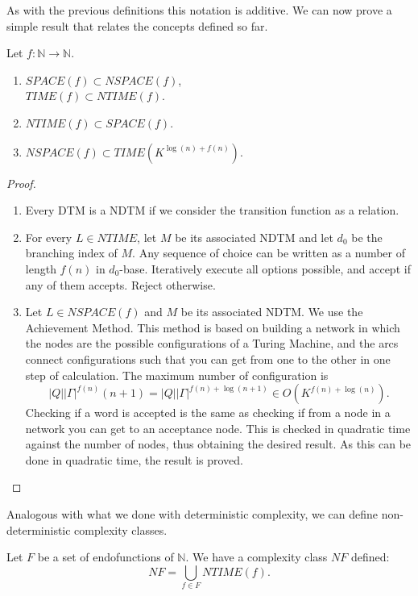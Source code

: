 As with the previous definitions this notation is additive. We can now prove a simple result that relates the concepts defined so far.

\begin{theorem}
  Let $f: \mathbb{N}\to  \mathbb{N}$.
  \begin{enumerate}
  \item $SPACE(f) \subset NSPACE(f)$,\\
    $TIME(f) \subset NTIME(f)$.
  \item $NTIME(f) \subset SPACE(f)$.
  \item $NSPACE(f) \subset TIME(K^{ \log(n)+ f(n)} )$.
  \end{enumerate}
\end{theorem}
\begin{proof}\hfill
  \begin{enumerate}
  \item Every DTM is a NDTM if we consider the transition function as a relation.
  
  \item For every $L\in NTIME$, let $M$ be its associated NDTM and let $d_0$ be the branching index of $M$. Any sequence of choice can be written as a number of length $f(n)$ in $d_0$-base. Iteratively execute all options possible, and accept if any of them accepts. Reject otherwise. 

    
  \item Let $L \in NSPACE(f)$ and $M$ be its associated NDTM. We use the Achievement Method. This method is based on building a network in which the nodes are the possible configurations of a Turing Machine, and the arcs connect configurations such that you can get from one to the other in one step of calculation. The maximum number of configuration is
    $$|Q||\Gamma|^{f(n)} (n + 1) = |Q||\Gamma|^{f(n)+\log(n + 1)} \in O (K^{f(n)+\log(n)}).$$
Checking if a word is accepted is the same as checking if from a node in a network you can get to an acceptance node. This is checked in quadratic time against the number of nodes, thus obtaining the desired result. As this can be done in quadratic time, the result is proved.
  \end{enumerate}
\end{proof}

Analogous with what we done with deterministic complexity, we can define non-deterministic complexity classes.

\begin{definition}
  Let $F$ be a set of endofunctions of $\mathbb{N}$. We have a complexity class $NF$ defined:
  $$NF =  \bigcup_{f \in F} NTIME(f) .$$
\end{definition}

